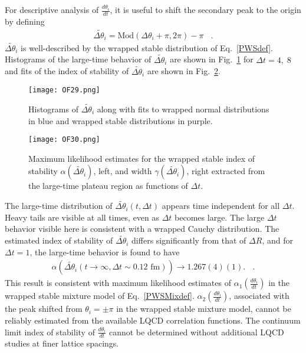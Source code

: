 For descriptive analysis of $\frac{d\theta_i}{dt}$, it is useful to shift the secondary peak to the origin by defining
%
\begin{equation}
  \begin{split}
    \widetilde{\Delta \theta_i} = \text{Mod}\left( \Delta \theta_i + \pi, 2\pi \right) - \pi
    \ \ \ \ .
  \end{split}
  \label{DeltaThTdef}
\end{equation}
%
$\widetilde{\Delta \theta_i}$ is well-described by the wrapped stable distribution of Eq.~\eqref{PWSdef}. 
Histograms of the large-time behavior of $\widetilde{\Delta \theta_i}$ are shown in Fig.~\ref{DeltaThHistograms} for $\Delta t = 4,\; 8$ 
and fits of the index of stability of $\widetilde{\Delta \theta_i}$ are shown in Fig.~\ref{DeltaThStable}. 
%
\begin{figure}[!ht]
  \centering
  \texttt{[image: OF29.png]}
  \caption{
  Histograms of  $\widetilde{\Delta \theta_i}$ along with fits to wrapped normal distributions in blue and wrapped stable distributions in purple.
  }
  \label{DeltaThHistograms}
\end{figure}
%
\begin{figure}[!ht]
  \centering
  \texttt{[image: OF30.png]}
  \caption{Maximum likelihood estimates for the wrapped stable index of stability $\alpha\left( \widetilde{\Delta \theta_i} \right)$, left, and width $\gamma\left( \widetilde{\Delta \theta_i} \right)$, right extracted from the large-time plateau region as functions of $\Delta t$.
}
  \label{DeltaThStable}
\end{figure}
%
The large-time distribution of $\widetilde{\Delta \theta_i}(t,\Delta t)$ appears time independent for all $\Delta t$. 
Heavy tails are visible at all times, even as $\Delta t$ becomes large. The large $\Delta t$ behavior visible here is consistent with a wrapped Cauchy distribution.
The estimated index of stability of $\widetilde{\Delta\theta_i}$ differs significantly from that of $\Delta R$, and for $\Delta t = 1$, the large-time behavior is found to have
%
\begin{equation}
  \begin{split}
    \alpha\left( \widetilde{\Delta\theta_i}(t\rightarrow\infty, \Delta t \sim 0.12\text{ fm}) \right) \rightarrow 1.267(4)(1).
    \ \ \ \  .
  \end{split}
  \label{alpha1}
\end{equation}
%
This result is consistent with maximum likelihood estimates of $\alpha_1\left( \frac{d\theta_i}{dt} \right)$ in the 
wrapped stable mixture model of Eq.~\eqref{PWSMixdef}. 
$\alpha_2\left( \frac{d\theta_i}{dt} \right)$, associated with the peak shifted from $\theta_i=\pm\pi$
in the wrapped stable mixture model, 
cannot be reliably estimated from the  available LQCD correlation functions. 
The continuum limit index of stability of $\frac{d\theta_i}{dt}$ cannot be determined without additional LQCD studies 
at finer lattice spacings.


